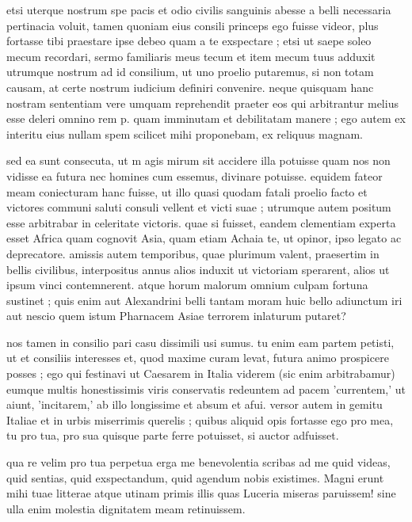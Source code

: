 


 etsi uterque nostrum spe pacis et odio civilis sanguinis abesse a belli necessaria pertinacia voluit, tamen quoniam eius consili princeps ego fuisse videor, plus fortasse tibi praestare ipse debeo quam a te exspectare ; etsi ut saepe soleo mecum recordari, sermo familiaris meus tecum et item mecum tuus adduxit utrumque nostrum ad id consilium, ut uno proelio putaremus, si non totam causam, at certe nostrum iudicium definiri convenire. neque quisquam hanc nostram sententiam vere umquam reprehendit praeter eos qui arbitrantur melius esse deleri omnino rem p. quam imminutam et debilitatam manere ; ego autem ex interitu eius nullam spem scilicet mihi proponebam, ex reliquus magnam.

 sed ea sunt consecuta, ut m agis mirum sit accidere illa potuisse quam nos non vidisse ea futura nec homines cum essemus, divinare potuisse. equidem fateor meam coniecturam hanc fuisse, ut illo quasi quodam fatali proelio facto et victores communi saluti consuli vellent et victi suae ; utrumque autem positum esse arbitrabar in celeritate victoris. quae si fuisset, eandem clementiam experta esset Africa quam cognovit Asia, quam etiam Achaia te, ut opinor, ipso legato ac deprecatore. amissis autem temporibus, quae plurimum valent, praesertim in bellis civilibus, interpositus annus alios induxit ut victoriam sperarent, alios ut ipsum vinci contemnerent. atque horum malorum omnium culpam fortuna sustinet ; quis enim aut Alexandrini belli tantam moram huic bello adiunctum iri aut nescio quem istum Pharnacem Asiae terrorem inlaturum putaret?

 nos tamen in consilio pari casu dissimili usi sumus. tu enim eam partem petisti, ut et consiliis interesses et, quod maxime curam levat, futura animo prospicere posses ; ego qui festinavi ut Caesarem in Italia viderem (sic enim arbitrabamur) eumque multis honestissimis viris conservatis redeuntem ad pacem 'currentem,' ut aiunt, 'incitarem,' ab illo longissime et absum et afui. versor autem in gemitu Italiae et in urbis miserrimis querelis ; quibus aliquid opis fortasse ego pro mea, tu pro tua, pro sua quisque parte ferre potuisset, si auctor adfuisset.

 qua re velim pro tua perpetua erga me benevolentia scribas ad me quid videas, quid sentias, quid exspectandum, quid agendum nobis existimes. Magni erunt mihi tuae litterae atque utinam primis illis quas Luceria miseras paruissem! sine ulla enim molestia dignitatem meam retinuissem.
